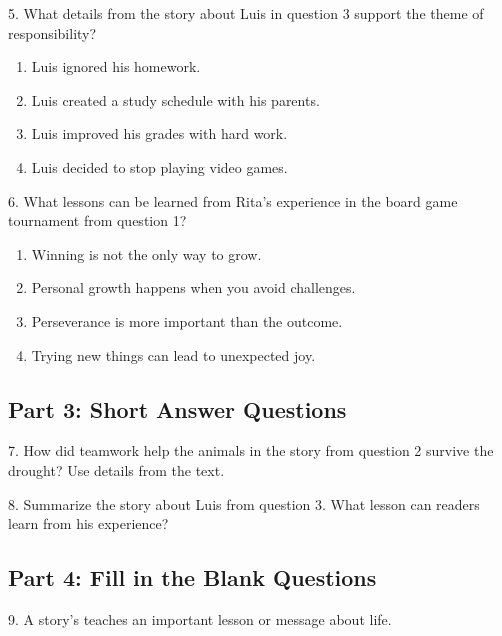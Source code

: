 \documentclass[12pt]{article}
\begin{document}
5. What details from the story about Luis in question 3 support the theme of \\responsibility?\\
\begin{enumerate}[label=\Alph*.]
    \item Luis ignored his homework.  
    \item Luis created a study schedule with his parents.  
    \item Luis improved his grades with hard work.  
    \item Luis decided to stop playing video games.  
\end{enumerate}

\vspace{1cm}

6. What lessons can be learned from Rita’s experience in the board game \\tournament from question 1?\\
\begin{enumerate}[label=\Alph*.]
    \item Winning is not the only way to grow.  
    \item Personal growth happens when you avoid challenges.  
    \item Perseverance is more important than the outcome.  
    \item Trying new things can lead to unexpected joy.  
\end{enumerate}

\vspace{1cm}
\newpage
\subsection*{Part 3: Short Answer Questions}

7. How did teamwork help the animals in the story from question 2 survive the drought? Use details from the text.\\
\vspace{4cm}

8. Summarize the story about Luis from question 3. What lesson can readers learn from his experience?\\
\vspace{4cm}

\subsection*{Part 4: Fill in the Blank Questions}
\vspace{1em
}
9. A story’s \underline{\hspace{4cm}} teaches an important lesson or message about life.
\end{document}
